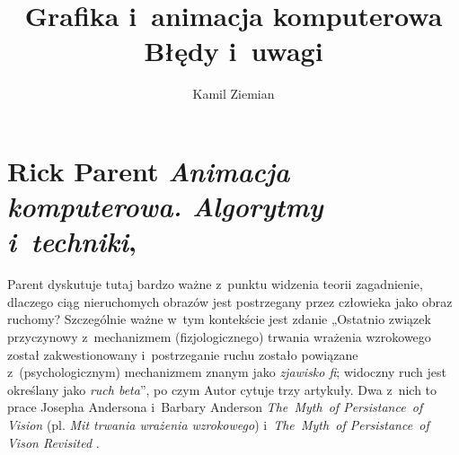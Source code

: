 \documentclass[a4paper,11pt]{article}
\title{Grafika i~animacja komputerowa \\
  {\Large Błędy i~uwagi}}
\author{Kamil Ziemian}
\numberwithin{equation}{section}
\begin{document}





\maketitle










\section{Rick Parent \textit{Animacja komputerowa. Algorytmy
    i~techniki},
  \parencite{Parent-Animacja-komputerowa-Algorytmy-i-techniki-Pub-2012}}

\label{sec:Parent-Animacja-komputerowa}





\noindent






\noindent










\noindent
{} Parent dyskutuje tutaj bardzo ważne z~punktu widzenia teorii
zagadnienie, dlaczego ciąg nieruchomych obrazów jest postrzegany przez
człowieka jako obraz ruchomy? Szczególnie ważne w~tym kontekście jest
zdanie „Ostatnio związek przyczynowy z~mechanizmem (fizjologicznego) trwania
wrażenia wzrokowego został zakwestionowany i~postrzeganie ruchu zostało
powiązane z~(psychologicznym) mechanizmem znanym jako \textit{zjawisko fi};
widoczny ruch jest określany jako \textit{ruch beta}”, po czym Autor cytuje
trzy artykuły. Dwa z~nich to prace Josepha Andersona i~Barbary Anderson
\textit{The~Myth~of Persistance~of Vision} (pl. \textit{Mit trwania wrażenia
  wzrokowego})
\parencite{Anderson-Fisher-The-Myth-of-Persistence-of-Vision-Pub-1978}
i~\textit{The~Myth~of Persistance~of Vison Revisited}
\parencite{Anderson-Anderson-The-Myth-of-Persistence-of-Vision-ETC-Pub-1993}.
\end{document}
